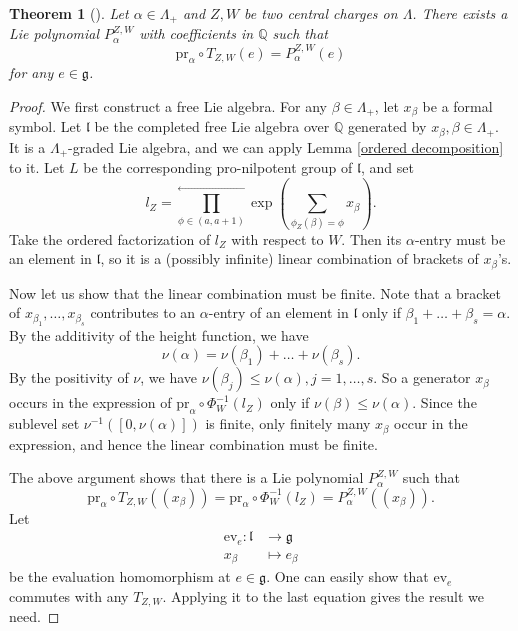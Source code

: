 \documentclass[a4paper,12pt]{amsart}
\numberwithin{equation}{section}
\newtheorem{theorem}{Theorem}[section]
\newcommand{\1}{\mathbf{1}}
\newcommand{\pr}{\mathrm{pr}}
\newcommand{\ev}{\mathrm{ev}}
\begin{document}
\begin{theorem}[{\cite[Section 2.3, Corollary 1]{KS2008}}]\label{universal Lie}
    Let $\alpha\in\Lambda_+$ and $Z,W$ be two central charges on $\Lambda$. There exists a Lie polynomial ${P_\alpha^{Z,W}}$ with coefficients in $\mathbb{Q}$ such that
    \[\pr_\alpha\circ T_{Z,W}(e)=P_\alpha^{Z,W}(e)\]
    for any $e\in\mathfrak{g}$.
\end{theorem}
\begin{proof}
    We first construct a free Lie algebra. For any $\beta\in\Lambda_+$, let $x_\beta$ be a formal symbol. Let $\mathfrak{l}$ be the completed free Lie algebra over $\mathbb{Q}$ generated by $x_\beta,\beta\in\Lambda_+$. It is a $\Lambda_+$-graded Lie algebra, and we can apply Lemma \ref{ordered decomposition} to it. Let $L$ be the corresponding pro-nilpotent group of $\mathfrak{l}$, and set
    \[l_Z=\prod_{\phi\in(a,a+1)}^\leftarrow\exp\left(\sum_{\phi_Z(\beta)=\phi}x_\beta\right).\]
    Take the ordered factorization of $l_Z$ with respect to $W$. Then its $\alpha$-entry must be an element in $\mathfrak{l}$, so it is a (possibly infinite) linear combination of brackets of $x_\beta$'s. 

    Now let us show that the linear combination must be finite. Note that a bracket of $x_{\beta_1},\dots,x_{\beta_s}$ contributes to an $\alpha$-entry of an element in $\mathfrak{l}$ only if $\beta_1+\dots+\beta_s=\alpha$. By the additivity of the height function, we have
    \[\nu(\alpha)=\nu(\beta_1)+\dots+\nu(\beta_s).\]
    By the positivity of $\nu$, we have $\nu(\beta_j)\leqslant\nu(\alpha),j=1,\dots,s$. So a generator $x_\beta$ occurs in the expression of $\pr_\alpha\circ\Phi_W^{-1}(l_Z)$ only if $\nu(\beta)\leqslant\nu(\alpha)$. Since the sublevel set $\nu^{-1}([0,\nu(\alpha)])$ is finite, only finitely many $x_\beta$ occur in the expression, and hence the linear combination must be finite.

    The above argument shows that there is a Lie polynomial $P^{Z,W}_\alpha$ such that
    \[\pr_\alpha\circ T_{Z,W}((x_\beta))=\pr_\alpha\circ\Phi_W^{-1}(l_Z)=P_\alpha^{Z,W}((x_\beta)).\]
    Let
    \begin{align*}
        \ev_e:\mathfrak{l}&\rightarrow\mathfrak{g}\\
        x_\beta&\mapsto e_\beta
    \end{align*}
    be the evaluation homomorphism at $e\in\mathfrak{g}$. One can easily show that $\ev_e$ commutes with any $T_{Z,W}$. Applying it to the last equation gives the result we need.
\end{proof}
\end{document}
